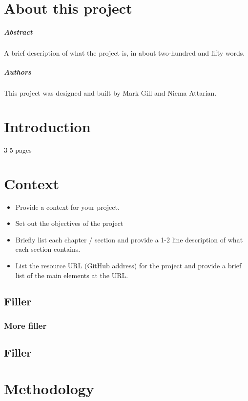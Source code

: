 
\chapter*{About this project}
\paragraph{Abstract}
A brief description of what the project is, in about two-hundred and fifty words.

\paragraph{Authors}
This project was designed and built by Mark Gill and Niema Attarian.


\chapter{Introduction}
3-5 pages

\chapter{Context}
\begin{itemize}
\item Provide a context for your project.
\item Set out the objectives of the project
\item Briefly list each chapter / section and provide a 1-2 line description of what each section contains.
\item List the resource URL (GitHub address) for the project and provide a brief list of the main elements at the URL.
\end{itemize}

\section{Filler}

\subsection{More filler}

\section{Filler}


\chapter{Methodology}

